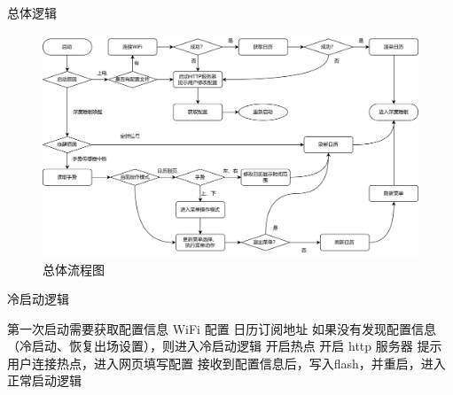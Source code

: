 \documentclass{ctexbeamer}
\begin{document}
\begin{frame}{总体逻辑}
    \begin{figure}[htp]
      \centering
      \includegraphics[width=.8\linewidth]{软件流程图.drawio.png}
      \caption{总体流程图}
    \end{figure}
\end{frame}

\begin{frame}{冷启动逻辑}
    \begin{outline}
        \1 第一次启动需要获取配置信息
            \2 WiFi 配置
            \2 日历订阅地址
        \1 如果没有发现配置信息（冷启动、恢复出场设置），则进入冷启动逻辑
            \2 开启热点
            \2 开启 http 服务器
            \2 提示用户连接热点，进入网页填写配置
        \1 接收到配置信息后，写入flash，并重启，进入正常启动逻辑
    \end{outline}
\end{frame}
\end{document}

